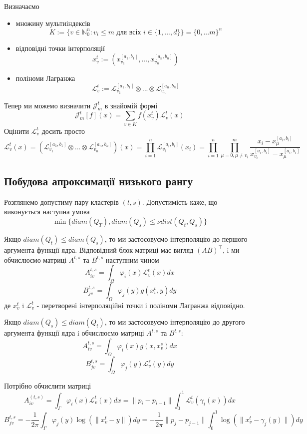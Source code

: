 \documentclass[12pt]{report}
\begin{document}
	Визначаємо
	\begin{itemize}
		\item множину мультиіндексів
		$$K:=\{v\in\mathbb{N}_0^n:v_i\le m \mbox{ для всіх } i\in \{1,...,d\}\}=\{0,...m\}^n$$
		\item відповідні точки інтерполяції
		$$x_v^t:=(x_{v_1}^{[a_1,b_1]},...,x_{v_n}^{[a_n,b_n]})$$
		\item поліноми Лагранжа
		$$\mathcal{L}_v^t:=\mathcal{L}_{v_1}^{[a_1,b_1]}\otimes...\otimes\mathcal{L}_{v_n}^{[a_n,b_n]}$$
	\end{itemize}
	Тепер ми можемо визначити $\mathcal{J}_m^t$ в знайомій формі
	$$\mathcal{J}_m^t[f](x)=\sum_{v\in K}f(x_v^t)\mathcal{L}_v^t(x)$$
	Оцінити $\mathcal{L}_v^t$ досить просто
	$$\mathcal{L}_v^t(x)=\left(\mathcal{L}_{v_1}^{[a_1,b_1]}\otimes...\otimes\mathcal{L}_{v_n}^{[a_n,b_n]}\right)(x)=\prod_{i=1}^{n}\mathcal{L}_{v_i}^{[a_i,b_i]}(x_i)=\prod_{i=1}^{n}\prod_{\mu=0,\mu\not=v_i}^{m}\frac{x_i-x_\mu^{[a_i,b_i]}}{x_{v_i}^{[a_i,b_i]}-x_\mu^{[a_i,b_i]}}$$
	\subsection{Побудова апроксимації низького рангу}
	\hspace{0.8cm} Розглянемо допустиму пару кластерів $(t,s)$. Допустимість каже, що виконується наступна умова
	$$\min\{diam(Q_T),diam(Q_s)\le \nu dist(Q_t,Q_s)\}$$
	\par Якщо $diam(Q_t)\le diam(Q_s)$, то ми застосовуємо інтерполяцію до першого аргумента функції ядра. Відповідний блок матриці має вигляд $(AB)^\top$, i ми обчислюємо матриці $A^{t,s}$ та $B^{t,s}$ наступним чином
	$$A_{iv}^{t,s}=\int_{\Omega}\varphi_i(x)\mathcal{L}_v^t(x)dx$$
	$$B_{jv}^{t,s}=\int_{\Omega}\varphi_j(y)g(x_v^t,y)dy$$
	де $x_v^t$ i $\mathcal{L}_v^t$ - перетворені інтерполяційні точки і поліноми Лагранжа відповідно.
	\par Якщо $diam(Q_s)\le diam(Q_t)$, то ми застосовуємо інтерполяцію до другого аргумента функції ядра i обчислюємо матриці $A^{t,s}$ та $B^{t,s}$:
	$$A_{iv}^{t,s}=\int_{\Omega}\varphi_i(x)g(x,x_v^s)dx$$
	$$B_{jv}^{t,s}=\int_{\Omega}\varphi_j(y)\mathcal{L}_v^s(y)dy$$
	
	\par Потрібно обчислити матриці
	$$A_{iv}^{(t,s)}=\int_{\Gamma}\varphi_i(x)\mathcal{L}_v^t(x)dx=\|p_i-p_{i-1}\|\int_{0}^{1}\mathcal{L}_v^t(\gamma_i(x))dx$$
	$$B_{jv}^{t,s}=-\frac{1}{2\pi}\int_{\Gamma}\varphi_j(y)\log(\|x_v^t-y\|)dy=-\frac{1}{2\pi}\|p_j-p_{j-1}\|\int_{0}^{1}\log(\|x_v^t-\gamma_j(y)\|)dy$$ 
	
\end{document}
